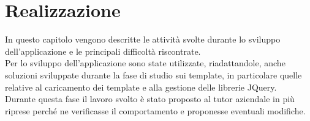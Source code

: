 
\chapter{Realizzazione}
\label{cap:realizzazione}
In questo capitolo vengono descritte le attività svolte durante lo sviluppo dell'applicazione e le principali difficoltà riscontrate.\\
Per lo sviluppo dell'applicazione sono state utilizzate, riadattandole, anche soluzioni sviluppate durante la fase di studio sui template, in particolare quelle relative al caricamento dei template e alla gestione delle librerie JQuery.\\
Durante questa fase il lavoro svolto è stato proposto al tutor aziendale in più riprese perché ne verificasse il comportamento e proponesse eventuali modifiche.

